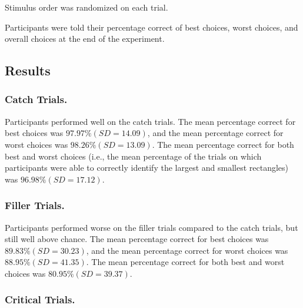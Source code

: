 Stimulus order was randomized on each trial. 

Participants were told their percentage correct of best choices, worst choices, and overall choices at the end of the experiment.

\subsection{Results}

\subsubsection{Catch Trials.}
Participants performed well on the catch trials. The mean percentage correct for best choices was $97.97\% (SD=14.09)$, and the mean percentage correct for worst choices was $98.26\% (SD=13.09)$. The mean percentage correct for both best and worst choices (i.e., the mean percentage of the trials on which participants were able to correctly identify the largest and smallest rectangles) was $96.98\% (SD=17.12)$. 

\subsubsection{Filler Trials.}
Participants performed worse on the filler trials compared to the catch trials, but still well above chance. The mean percentage correct for best choices was $89.83\% (SD=30.23)$, and the mean percentage correct for worst choices was $88.95\% (SD=41.35)$. The mean percentage correct for both best and worst choices was $80.95\% (SD=39.37)$. 

\subsubsection{Critical Trials.}



